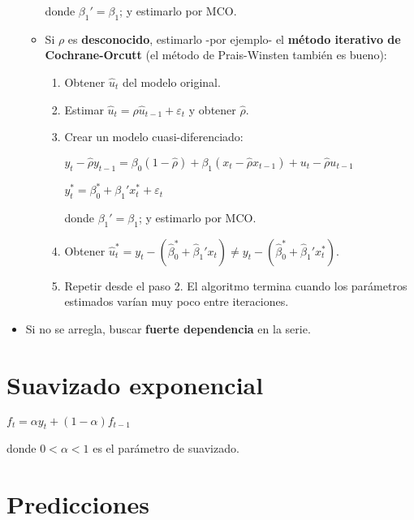 \documentclass[10pt, a4paper, landscape]{article}
\begin{document}
\begin{multicols}{3}
\begin{itemize}[leftmargin=*]
\begin{itemize}[leftmargin=*]
				donde $\beta_{1}' = \beta_{1}$; y estimarlo por MCO.
				
				\item Si $\rho$ es \textbf{desconocido}, estimarlo -por ejemplo- el \textbf{método iterativo de Cochrane-Orcutt} (el método de Prais-Winsten también es bueno):
				
				\begin{enumerate}[leftmargin=*]
					\item Obtener $\hat{u}_{t}$ del modelo original.
					\item Estimar $\hat{u}_{t} = \rho \hat{u}_{t-1} + \varepsilon_{t}$ y obtener $\hat{\rho}$.
					\item Crear un modelo cuasi-diferenciado:
					
					\begin{center}
						$y_{t} - \hat{\rho}y_{t - 1} = \beta_{0} (1 - \hat{\rho}) + \beta_{1} (x_{t} - \hat{\rho} x_{t - 1}) + u_{t} - \hat{\rho}u_{t - 1}$
						
						$y_{t}^{*} = \beta_{0}^{*} + \beta_{1}' x_{t}^{*} + \varepsilon_{t}$
					\end{center}
					
					donde $\beta_{1}' = \beta_{1}$; y estimarlo por MCO.
					
					\item Obtener $\hat{u}_{t}^{*} = y_{t} - (\hat{\beta}_{0}^{*} + \hat{\beta}_{1}' x_{t}) \neq y_{t} - (\hat{\beta}_{0}^{*} + \hat{\beta}_{1}' x_{t}^{*})$.
					\item Repetir desde el paso 2. El algoritmo termina cuando los parámetros estimados varían muy poco entre iteraciones.
				\end{enumerate}
			\end{itemize}
			
			\item Si no se arregla, buscar \textbf{fuerte dependencia} en la serie.
		\end{itemize}
		
		\section*{Suavizado exponencial}
		
		\begin{center}
			$f_{t} = \alpha y_{t} + (1 - \alpha) f_{t - 1}$
		\end{center}
		
		donde $0 < \alpha < 1$ es el parámetro de suavizado.
		
		\section*{Predicciones}
		

\end{multicols}
\end{document}
